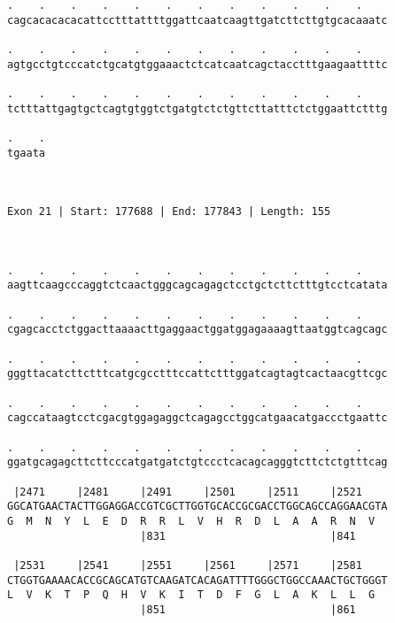 \documentclass{article}
\begin{document}
\begin{Verbatim}
.    .    .    .    .    .    .    .    .    .    .    .    
cagcacacacacattcctttattttggattcaatcaagttgatcttcttgtgcacaaatc
                                                            
.    .    .    .    .    .    .    .    .    .    .    .    
agtgcctgtcccatctgcatgtggaaactctcatcaatcagctacctttgaagaattttc
                                                            
.    .    .    .    .    .    .    .    .    .    .    .    
tctttattgagtgctcagtgtggtctgatgtctctgttcttatttctctggaattctttg
                                                            
.    .
tgaata
      
      
 
Exon 21 | Start: 177688 | End: 177843 | Length: 155



.    .    .    .    .    .    .    .    .    .    .    .    
aagttcaagcccaggtctcaactgggcagcagagctcctgctcttctttgtcctcatata
                                                            
.    .    .    .    .    .    .    .    .    .    .    .    
cgagcacctctggacttaaaacttgaggaactggatggagaaaagttaatggtcagcagc
                                                            
.    .    .    .    .    .    .    .    .    .    .    .    
gggttacatcttctttcatgcgcctttccattctttggatcagtagtcactaacgttcgc
                                                            
.    .    .    .    .    .    .    .    .    .    .    .    
cagccataagtcctcgacgtggagaggctcagagcctggcatgaacatgaccctgaattc
                                                            
.    .    .    .    .    .    .    .    .    .    .    .    
ggatgcagagcttcttcccatgatgatctgtccctcacagcagggtcttctctgtttcag
                                                            
 |2471     |2481     |2491     |2501     |2511     |2521    
GGCATGAACTACTTGGAGGACCGTCGCTTGGTGCACCGCGACCTGGCAGCCAGGAACGTA
G  M  N  Y  L  E  D  R  R  L  V  H  R  D  L  A  A  R  N  V  
                     |831                          |841     
  
 |2531     |2541     |2551     |2561     |2571     |2581    
CTGGTGAAAACACCGCAGCATGTCAAGATCACAGATTTTGGGCTGGCCAAACTGCTGGGT
L  V  K  T  P  Q  H  V  K  I  T  D  F  G  L  A  K  L  L  G  
                     |851                          |861     
  

\end{Verbatim}
\end{document}
